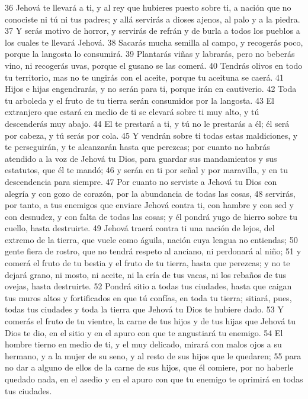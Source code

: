 36 Jehová te llevará a ti, y al rey que hubieres puesto sobre ti, a nación que no conociste ni tú ni tus padres; y allá servirás a dioses ajenos, al palo y a la piedra.
37 Y serás motivo de horror, y servirás de refrán y de burla a todos los pueblos a los cuales te llevará Jehová.
38 Sacarás mucha semilla al campo, y recogerás poco, porque la langosta lo consumirá.
39 Plantarás viñas y labrarás, pero no beberás vino, ni recogerás uvas, porque el gusano se las comerá.
40 Tendrás olivos en todo tu territorio, mas no te ungirás con el aceite, porque tu aceituna se caerá.
41 Hijos e hijas engendrarás, y no serán para ti, porque irán en cautiverio.
42 Toda tu arboleda y el fruto de tu tierra serán consumidos por la langosta.
43 El extranjero que estará en medio de ti se elevará sobre ti muy alto, y tú descenderás muy abajo.
44 El te prestará a ti, y tú no le prestarás a él; él será por cabeza, y tú serás por cola.
45 Y vendrán sobre ti todas estas maldiciones, y te perseguirán, y te alcanzarán hasta que perezcas; por cuanto no habrás atendido a la voz de Jehová tu Dios, para guardar sus mandamientos y sus estatutos, que él te mandó;
46 y serán en ti por señal y por maravilla, y en tu descendencia para siempre.
47 Por cuanto no serviste a Jehová tu Dios con alegría y con gozo de corazón, por la abundancia de todas las cosas,
48 servirás, por tanto, a tus enemigos que enviare Jehová contra ti, con hambre y con sed y con desnudez, y con falta de todas las cosas; y él pondrá yugo de hierro sobre tu cuello, hasta destruirte.
49 Jehová traerá contra ti una nación de lejos, del extremo de la tierra, que vuele como águila, nación cuya lengua no entiendas;
50 gente fiera de rostro, que no tendrá respeto al anciano, ni perdonará al niño;
51 y comerá el fruto de tu bestia y el fruto de tu tierra, hasta que perezcas; y no te dejará grano, ni mosto, ni aceite, ni la cría de tus vacas, ni los rebaños de tus ovejas, hasta destruirte.
52 Pondrá sitio a todas tus ciudades, hasta que caigan tus muros altos y fortificados en que tú confías, en toda tu tierra; sitiará, pues, todas tus ciudades y toda la tierra que Jehová tu Dios te hubiere dado.
53 Y comerás el fruto de tu vientre, la carne de tus hijos y de tus hijas que Jehová tu Dios te dio, en el sitio y en el apuro con que te angustiará tu enemigo.
54 El hombre tierno en medio de ti, y el muy delicado, mirará con malos ojos a su hermano, y a la mujer de su seno, y al resto de sus hijos que le quedaren;
55 para no dar a alguno de ellos de la carne de sus hijos, que él comiere, por no haberle quedado nada, en el asedio y en el apuro con que tu enemigo te oprimirá en todas tus ciudades.

